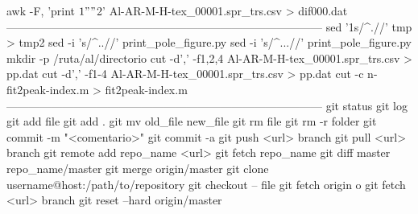 awk -F, '{print $1 " " $2}' Al-AR-M-H-tex_00001.spr_trs.csv > dif000.dat
------------------------------------------------------------------------------------
sed '1s/^.//' tmp > tmp2
sed -i 's/^..//' print_pole_figure.py
sed -i 's/^...//' print_pole_figure.py
mkdir -p /ruta/al/directorio
cut -d',' -f1,2,4 Al-AR-M-H-tex_00001.spr_trs.csv > pp.dat
cut -d',' -f1-4 Al-AR-M-H-tex_00001.spr_trs.csv > pp.dat
cut -c n- fit2peak-index.m > fit2peak-index.m
------------------------------------------------------------------------------------
git status
git log
git add file
git add .
git mv old_file new_file
git rm file
git rm -r folder
git commit -m "<comentario>"
git commit -a
git push <url> branch
git pull <url> branch
git remote add repo_name <url>
git fetch repo_name
git diff master repo_name/master
git merge origin/master
git clone username@host:/path/to/repository
git checkout -- file
git fetch origin o git fetch <url> branch
git reset --hard origin/master
